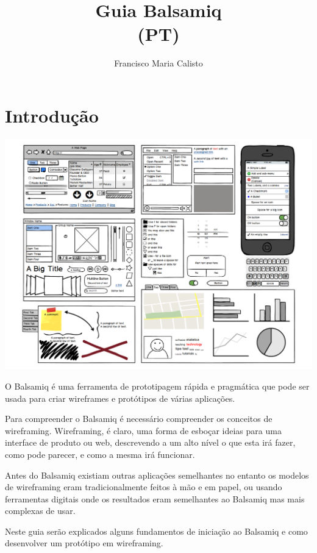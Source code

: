 \documentclass{tufte-book} %
\title{Guia Balsamiq\\(PT)}
\author[Professor]{Francisco Maria Calisto}
\begin{document}
\maketitle

\let\cleardoublepage\clearpage

\tableofcontents

\let\cleardoublepage\clearpage

\chapter*{Introdução}

\begin{center}
	\includegraphics[width=15cm]{img1.png}
\end{center}

O Balsamiq é uma ferramenta de prototipagem rápida e pragmática que pode ser usada para criar wireframes e protótipos de várias aplicações.

Para compreender o Balsamiq é necessário compreender os conceitos de wireframing. Wireframing, é claro, uma forma de esboçar ideias para uma interface de produto ou web, descrevendo a um alto nível o que esta irá fazer, como pode parecer, e como a mesma irá funcionar.

Antes do Balsamiq existiam outras aplicações semelhantes no entanto os modelos de wireframing eram tradicionalmente feitos à mão e em papel, ou usando ferramentas digitais onde os resultados eram semelhantes ao Balsamiq mas mais complexas de usar.

Neste guia serão explicados alguns fundamentos de iniciação ao Balsamiq e como desenvolver um protótipo em wireframing.
\end{document}
